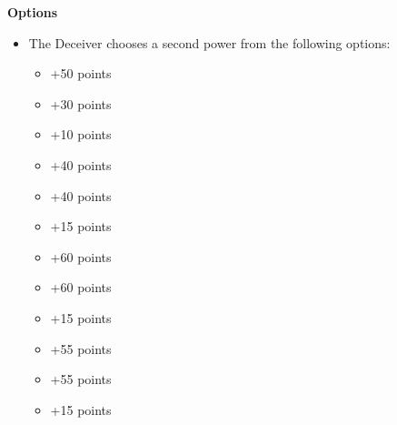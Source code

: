 \begin{minipage}[t]{0.72\textwidth}
	\vspace*{2em}
	\textbf{Options}
	\begin{itemize}
		\item The Deceiver chooses a second power from the following options:
		\begin{itemize}
			\item {} \dotfill +50 points
			\item {} \dotfill +30 points
			\item {} \dotfill +10 points
			\item {} \dotfill +40 points
			\item {} \dotfill +40 points
			\item {} \dotfill +15 points
			\item {} \dotfill +60 points
			\item {} \dotfill +60 points
			\item {} \dotfill +15 points
			\item {} \dotfill +55 points
			\item {} \dotfill +55 points
			\item {} \dotfill +15 points
		\end{itemize}
	\end{itemize}
\end{minipage}
\hspace{0.5em}

\newpage
\subsubsection[C'tan Shard of Mag'ladroth, the Void Dragon]{}

